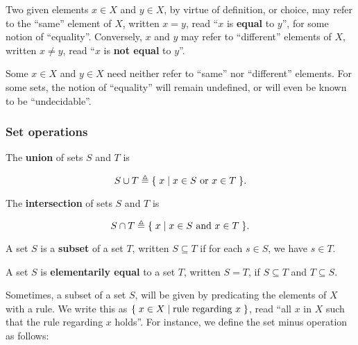 \begin{notation} Two given elements $x\in X$ and $y\in X$, by virtue of
definition, or choice, may refer to the ``same'' element of $X$, written $x=y$,
read ``$x$ is \textbf{equal} to $y$'', for some notion of ``equality''.
Conversely, $x$ and $y$ may refer to ``different'' elements of $X$, written
$x\neq y$, read ``$x$ is \textbf{not equal} to $y$''.\end{notation}

\begin{remark} Some $x\in X$ and $y\in X$ need neither refer to ``same''
nor ``different'' elements. For some sets, the notion of ``equality'' will
remain undefined, or will even be known to be ``undecidable''. \end{remark}

\subsubsection{Set operations}

\begin{definition} The \textbf{union} of sets $S$ and $T$ is

$$S\cup T\triangleq \mathopen{}\left\{\mathrel{}{x\mathrel{}\mid\mathrel{}{\text{$x\in S$ or $x\in T$}}}\mathrel{}\right\}\mathclose{}.$$

\end{definition}

\begin{definition} The \textbf{intersection} of sets $S$ and $T$ is

$$S\cap T\triangleq \mathopen{}\left\{\mathrel{}{x\mathrel{}\mid\mathrel{}{\text{$x\in S$ and $x\in T$}}}\mathrel{}\right\}\mathclose{}.$$

\end{definition}

\begin{definition} A set $S$ is a \textbf{subset} of a set $T$, written
$S\subseteq T$ if for each $s\in S$, we have $s\in T$. \end{definition}

\begin{definition} A set $S$ is \textbf{elementarily equal} to a set $T$,
written $S=T$, if $S\subseteq T$ and $T\subseteq S$. \end{definition} 

Sometimes, a subset of a set $S$, will be given by predicating the elements of
$X$ with a rule. We write this as $\mathopen{}\left\{\mathrel{}{x\in X\mathrel{}\mid\mathrel{}{\text{rule regarding $x$}}}\mathrel{}\right\}\mathclose{}$,
read ``all $x$ in $X$ such that the rule regarding $x$ holds''. For instance,
we define the set minus operation as follows:

